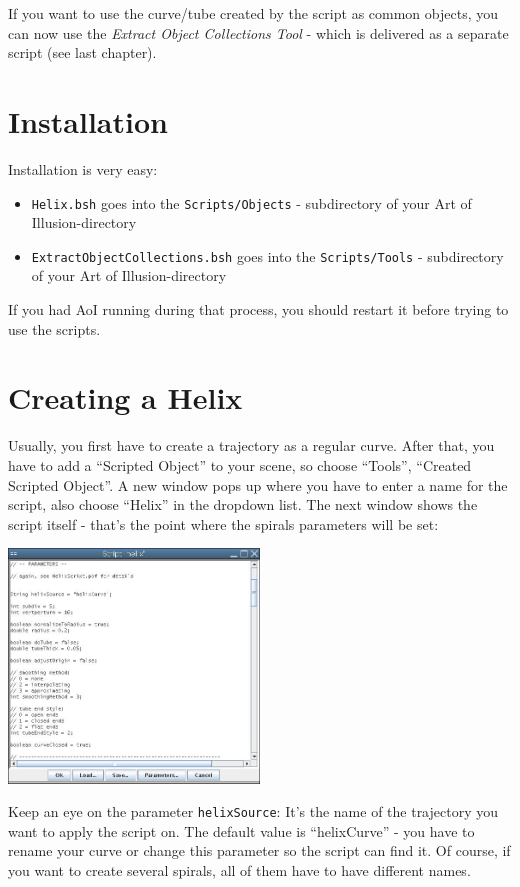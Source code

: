 \documentclass[12pt,a4paper]{scrartcl}
\begin{document}
If you want to use the curve/tube created by the script as common objects,
you can now use the \emph{Extract Object Collections Tool} - which is
delivered as a separate script (see last chapter).

\section{Installation}
Installation is very easy:
\begin{itemize}
	\item \texttt{Helix.bsh} goes into the \texttt{Scripts/Objects} -
	subdirectory of your Art of Illusion-directory
	\item \texttt{ExtractObjectCollections.bsh} goes into the \texttt{Scripts/Tools} -
	subdirectory of your Art of Illusion-directory
\end{itemize}
If you had AoI running during that process, you should restart it
before trying to use the scripts.

\section{Creating a Helix}
Usually, you first have to create a trajectory as a regular curve.
After that, you have to add a ``Scripted Object'' to your scene, so
choose ``Tools'', ``Created Scripted Object''. A new window pops up
where you have to enter a name for the script, also choose ``Helix''
in the dropdown list. The next window shows the script itself - that's
the point where the spirals parameters will be set:
\begin{center}
	\includegraphics[width=0.5\textwidth]{../pics/createSO.jpg}
\end{center}
Keep an eye on the parameter \texttt{helixSource}: It's the name of the
trajectory you want to apply the script on. The default value is
``helixCurve'' - you have to rename your curve or change this parameter
so the script can find it. Of course, if you want to create several
spirals, all of them have to have different names.
\end{document}
